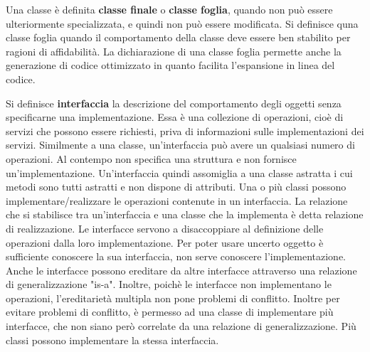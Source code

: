 \documentclass[a4paper,18pt]{extarticle}
\begin{document}
Una classe è definita \textbf{classe finale} o \textbf{classe foglia}, quando non può essere ulteriormente specializzata, e quindi non può essere modificata. Si definisce quna classe foglia quando il comportamento della classe deve essere ben stabilito per ragioni di affidabilità. La dichiarazione di una classe foglia permette anche la generazione di codice ottimizzato in quanto facilita l'espansione in linea del codice.

Si definisce \textbf{interfaccia} la descrizione del comportamento degli oggetti senza specificarne una implementazione. Essa è una collezione di operazioni, cioè di servizi che possono essere richiesti, priva di informazioni sulle implementazioni dei servizi. Similmente a una classe, un'interfaccia può avere un qualsiasi numero di operazioni. Al contempo non specifica una struttura e non fornisce un'implementazione. Un'interfaccia quindi assomiglia a una classe astratta i cui metodi sono tutti astratti e non dispone di attributi. Una o più classi possono implementare/realizzare le operazioni contenute in un interfaccia. La relazione che si stabilisce tra un'interfaccia e una classe che la implementa è detta relazione di realizzazione. Le interfacce servono a disaccoppiare al definizione delle operazioni dalla loro implementazione. Per poter usare uncerto oggetto è sufficiente conoscere la sua interfaccia, non serve conoscere l'implementazione. Anche le interfacce possono ereditare da altre interfacce attraverso una relazione di generalizzazione "is-a". Inoltre, poichè le interfacce non implementano le operazioni, l'ereditarietà multipla non pone problemi di conflitto. Inoltre per evitare problemi di conflitto, è permesso ad una classe di implementare più interfacce, che non siano però correlate da una relazione di generalizzazione. Più classi possono implementare la stessa interfaccia.
\end{document}
